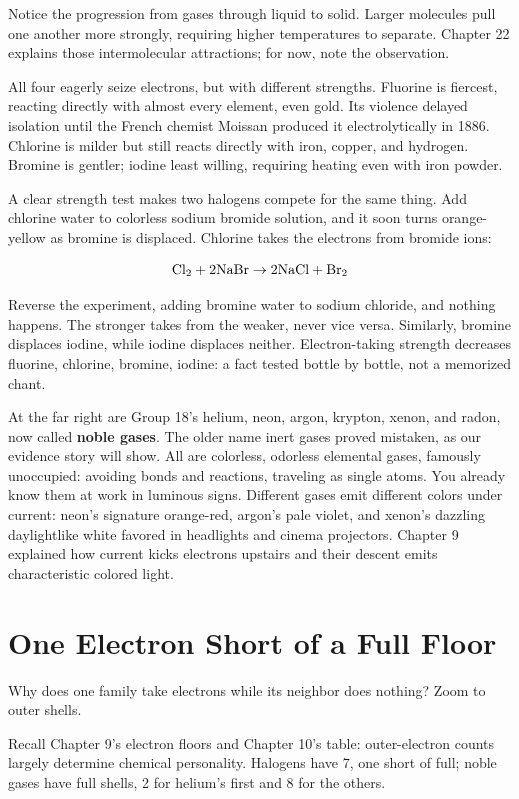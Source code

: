 Notice the progression from gases through liquid to solid. Larger molecules pull one another more strongly, requiring higher temperatures to separate. Chapter 22 explains those intermolecular attractions; for now, note the observation.

All four eagerly seize electrons, but with different strengths. Fluorine is fiercest, reacting directly with almost every element, even gold. Its violence delayed isolation until the French chemist Moissan produced it electrolytically in 1886. Chlorine is milder but still reacts directly with iron, copper, and hydrogen. Bromine is gentler; iodine least willing, requiring heating even with iron powder.

A clear strength test makes two halogens compete for the same thing. Add chlorine water to colorless sodium bromide solution, and it soon turns orange-yellow as bromine is displaced. Chlorine takes the electrons from bromide ions:

\[\mathrm{Cl_2} + \mathrm{2NaBr} \rightarrow \mathrm{2NaCl} + \mathrm{Br_2}\]

Reverse the experiment, adding bromine water to sodium chloride, and nothing happens. The stronger takes from the weaker, never vice versa. Similarly, bromine displaces iodine, while iodine displaces neither. Electron-taking strength decreases fluorine, chlorine, bromine, iodine: a fact tested bottle by bottle, not a memorized chant.

At the far right are Group 18's helium, neon, argon, krypton, xenon, and radon, now called \textbf{noble gases}. The older name inert gases proved mistaken, as our evidence story will show. All are colorless, odorless elemental gases, famously unoccupied: avoiding bonds and reactions, traveling as single atoms. You already know them at work in luminous signs. Different gases emit different colors under current: neon's signature orange-red, argon's pale violet, and xenon's dazzling daylightlike white favored in headlights and cinema projectors. Chapter 9 explained how current kicks electrons upstairs and their descent emits characteristic colored light.

\section{One Electron Short of a Full Floor}

Why does one family take electrons while its neighbor does nothing? Zoom to outer shells.

Recall Chapter 9's electron floors and Chapter 10's table: outer-electron counts largely determine chemical personality. Halogens have 7, one short of full; noble gases have full shells, 2 for helium's first and 8 for the others.

